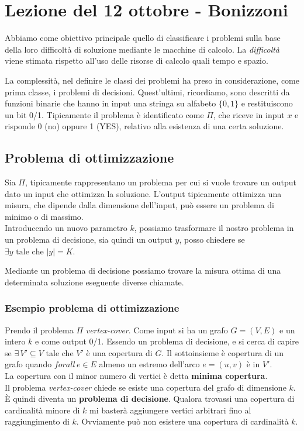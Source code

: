 \raggedbottom
\section{Lezione del 12 ottobre - Bonizzoni }
Abbiamo come obiettivo principale quello di classificare i problemi sulla base della loro difficoltà di soluzione mediante le macchine di calcolo. La \textit{difficoltà} viene stimata rispetto all'uso delle risorse di calcolo quali tempo e spazio.

La complessità, nel definire le classi dei problemi ha preso in considerazione, come prima classe, i problemi di decisioni.
Quest'ultimi, ricordiamo, sono descritti da funzioni binarie che hanno in input una stringa su alfabeto $\{0,1\}$ e restituiscono un bit 0/1. Tipicamente il problema è identificato come $\Pi$, che riceve in input $x$ e risponde 0 (no) oppure 1 (YES), relativo alla esistenza di una certa soluzione.

\subsection{Problema di ottimizzazione}
Sia $\Pi$, tipicamente rappresentano un problema per cui si vuole trovare un output dato un input che ottimizza la soluzione. L'output tipicamente ottimizza una misura, che dipende dalla dimensione dell'input, può essere un problema di minimo o di massimo.\\
Introducendo un nuovo parametro $k$, possiamo trasformare il nostro problema in un problema di decisione, sia quindi un output $y$, posso chiedere se $\exists y \mbox{ tale che } |y| = K$.

Mediante un problema di decisione possiamo trovare la misura ottima di una determinata soluzione eseguente diverse chiamate.

\subsubsection{Esempio problema di ottimizzazione}
Prendo il problema $\Pi$ \emph{vertex-cover}. Come input si ha un grafo $G=(V,E)$ e un intero $k$ e come output 0/1.
Essendo un problema di decisione, e si cerca di capire se $\exists\, V'\subseteq V$ tale che $V'$ è una copertura di $G$. Il sottoinsieme è copertura di un grafo quando $forall\, e\in E$ almeno un estremo dell'arco $e=(u,v)$ è in $V'$. \\
La copertura con il minor numero di vertici è detta \textbf{minima copertura}.\\ 
Il problema \emph{vertex-cover} chiede se esiste una copertura del grafo di dimensione $k$. È quindi diventa un \textbf{problema di decisione}. Qualora trovassi una copertura di cardinalità minore di $k$ mi basterà aggiungere vertici arbitrari fino al raggiungimento di $k$. Ovviamente può non esistere una copertura di cardinalità $k$.\\ 
